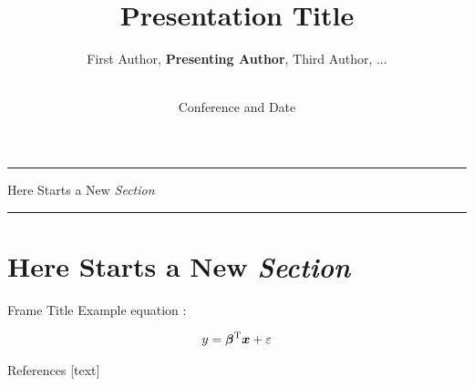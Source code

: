\documentclass[10pt]{beamer} %
\author{
    First Author,
    \textbf{Presenting Author},
    Third Author, ...}
\title{
    Presentation Title}
\institute{Technical University of Denmark}
\date{\\[\bigskipamount]Conference and Date}
\newcommand{\transframe}[1]{
    \begin{frame}[c]{}
        \begin{center}
        \hrule \vskip 15pt
        \huge #1
        \vskip 15pt \hrule
        \end{center}
    \end{frame}
}
\newcommand{\secframe}[1]{
    \transframe{#1}
    \section{#1}
}
\renewcommand{\vec}[1]{\bm{#1}}
\newcommand{\vectrans}[1]{\vec{#1}^{\mbox{\scriptsize T}}}
\begin{document}
\begin{frame}[t,plain]
\titlepage
\end{frame}

\secframe{Here Starts a New \emph{Section}}

\begin{frame}[t]{Frame Title}
Example equation \cite{dummycite}:

\begin{align}
    y = \vectrans{\beta} \vec{x} + \varepsilon
\end{align}
\end{frame}

\begin{frame}[t]{References}  %
    [text]
    \renewcommand*{\bibfont}{\small}
    \printbibliography
\end{frame}
\end{document}
